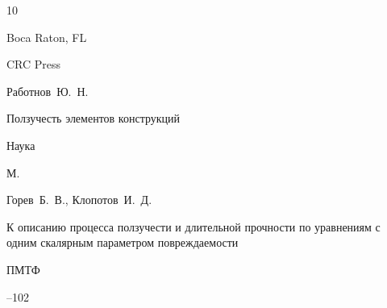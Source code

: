\begin{thebibliography}{10}

\publaddr Boca Raton, FL

\publ CRC Press








\by Работнов~Ю.~Н.

\book Ползучесть элементов конструкций


\publ Наука

\publaddr М.















\by  Горев~Б.~В., Клопотов~И.~Д. 

\paper К описанию процесса ползучести и длительной прочности по уравнениям с одним скалярным параметром повреждаемости

\jour ПМТФ



--102












\end{thebibliography}
